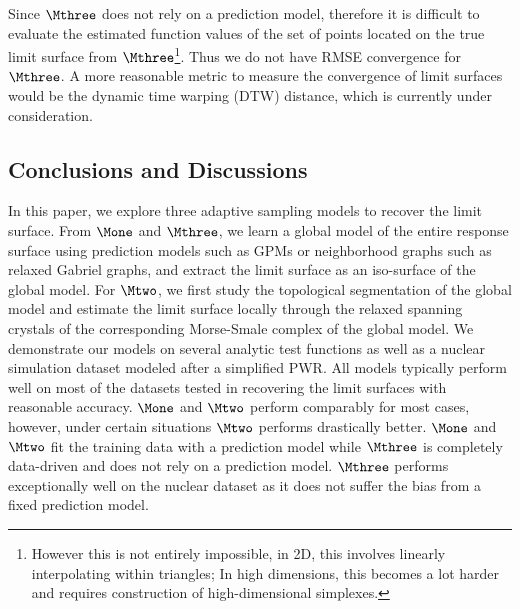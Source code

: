 Since $\Mthree$ does not rely on a prediction model, therefore it is difficult to evaluate the estimated function values of the set of points located on the true limit surface from $\Mthree$\footnote{However this is not entirely impossible, in 2D, this involves linearly interpolating within triangles; In high dimensions, this becomes a lot harder and requires construction of high-dimensional simplexes.}.
%
Thus we do not have RMSE convergence for $\Mthree$.
%
A more reasonable metric to measure the convergence of limit surfaces would be the dynamic time warping (DTW) distance, which is currently under consideration.

\subsection{Conclusions and Discussions}
\label{sec:discussion}

In this paper, we explore three adaptive sampling models to recover the limit surface.
%
From $\Mone$ and $\Mthree$,  we learn a global model of the entire response surface using prediction models such as GPMs or neighborhood graphs such as relaxed Gabriel graphs, and extract the limit surface as an iso-surface of the global model.
%
For $\Mtwo$, we first study the topological segmentation of the global model and estimate the limit surface locally through the relaxed spanning crystals of the corresponding Morse-Smale complex of the global model.
%
We demonstrate our models on several analytic test functions as well as a nuclear simulation dataset modeled after a simplified PWR.
%
All models typically perform well on most of the datasets tested in recovering the limit surfaces with reasonable accuracy.
%
$\Mone$ and $\Mtwo$ perform comparably for most cases, however, under certain situations $\Mtwo$ performs drastically better.
%
$\Mone$ and $\Mtwo$ fit the training data with a prediction model while $\Mthree$ is completely data-driven and does not rely on a prediction model.
%
$\Mthree$ performs exceptionally well on the nuclear dataset as it does not suffer the bias from a fixed prediction model.

